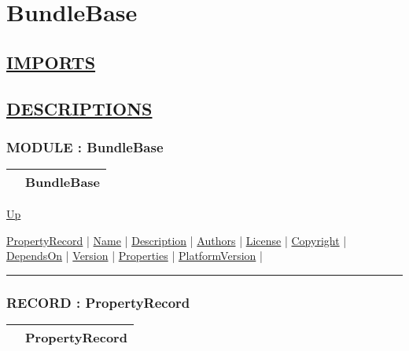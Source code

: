 \chapter*{BundleBase}
\hypertarget{ecldoc:toc:BundleBase}{}

\section*{\underline{IMPORTS}}

\section*{\underline{DESCRIPTIONS}}
\subsection*{MODULE : BundleBase}
\hypertarget{ecldoc:BundleBase}{}

{\renewcommand{\arraystretch}{1.5}
\begin{tabularx}{\textwidth}{|>{\raggedright\arraybackslash}l|X|}
\hline
\hspace{0pt} & BundleBase \\
\hline
\end{tabularx}
}

\hyperlink{ecldoc:toc:root}{Up}

\par


\hyperlink{ecldoc:bundlebase.propertyrecord}{PropertyRecord}  |
\hyperlink{ecldoc:bundlebase.name}{Name}  |
\hyperlink{ecldoc:bundlebase.description}{Description}  |
\hyperlink{ecldoc:bundlebase.authors}{Authors}  |
\hyperlink{ecldoc:bundlebase.license}{License}  |
\hyperlink{ecldoc:bundlebase.copyright}{Copyright}  |
\hyperlink{ecldoc:bundlebase.dependson}{DependsOn}  |
\hyperlink{ecldoc:bundlebase.version}{Version}  |
\hyperlink{ecldoc:bundlebase.properties}{Properties}  |
\hyperlink{ecldoc:bundlebase.platformversion}{PlatformVersion}  |

\rule{\textwidth}{0.4pt}

\subsection*{RECORD : PropertyRecord}
\hypertarget{ecldoc:bundlebase.propertyrecord}{}

{\renewcommand{\arraystretch}{1.5}
\begin{tabularx}{\textwidth}{|>{\raggedright\arraybackslash}l|X|}
\hline
\hspace{0pt} & PropertyRecord \\
\hline
\end{tabularx}
}

